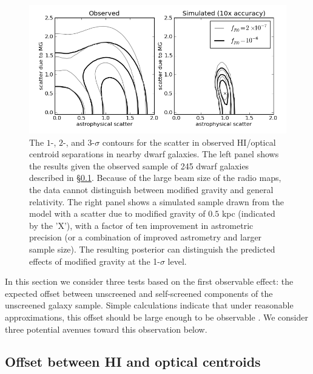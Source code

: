 \documentclass{emulateapj}
\begin{document}
\begin{figure}
\centering
\includegraphics[scale=0.7]{figures/Offset_HI_optical_jake.png}
\caption{The $1$-, $2$-, and $3$-$\sigma$ contours for the scatter in observed
  HI/optical centroid separations in nearby dwarf galaxies.  The left panel
  shows the results given the observed sample of 245 dwarf galaxies described
  in \S\ref{sec:h1-opt-offset}.  Because of the large  beam size of
  the radio maps, the data cannot distinguish between modified gravity and
  general relativity.  The right panel shows a simulated sample drawn from the
  model with a scatter due to modified gravity of $0.5$ kpc (indicated by the
'X'), %
  with a factor of ten improvement in astrometric precision (or a combination of improved astrometry and larger sample size).  The resulting
  posterior can distinguish the predicted effects of modified gravity at the
  1-$\sigma$ level.}
\label{fig:offset-analysis}
\end{figure}

In this section we consider three tests based on the first observable effect:
the expected offset between unscreened and self-screened components of the
unscreened galaxy sample. Simple calculations indicate that under
reasonable approximations, this offset should be large enough to be
observable \citep{bhuvjake2011}.  We consider three potential avenues toward
this observation below.

\subsection{Offset between HI and optical centroids}
\label{sec:h1-opt-offset}
\end{document}
